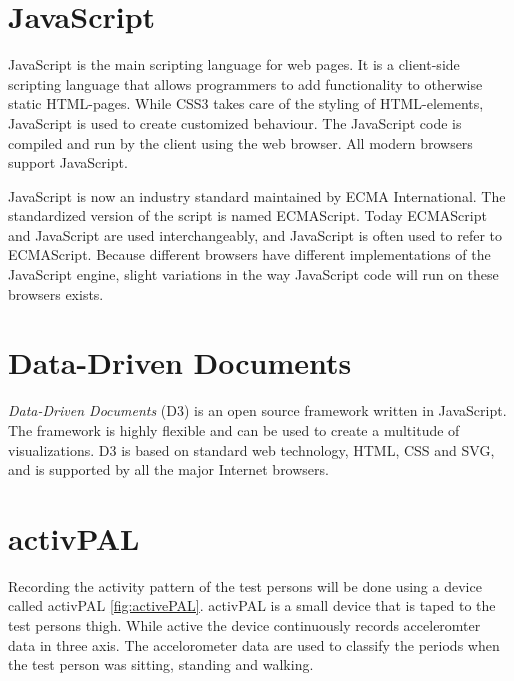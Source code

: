 \section{JavaScript}
JavaScript is the main scripting language for web pages. It is a client-side scripting language that allows programmers to add functionality to otherwise static HTML-pages. While CSS3 takes care of the styling of HTML-elements, JavaScript is used to create customized behaviour. The JavaScript code is compiled and run by the client using the web browser. All modern browsers support JavaScript. %

JavaScript is now an industry standard maintained by ECMA International. The standardized version of the script is named ECMAScript. Today ECMAScript and JavaScript are used interchangeably, and JavaScript is often used to refer to ECMAScript. Because different browsers have different implementations of the JavaScript engine, slight variations in the way JavaScript code will run on these browsers exists.
      
\section{Data-Driven Documents}
\emph{Data-Driven Documents} (D3) is an open source framework written in JavaScript. The framework is highly flexible and can be used to create a multitude of visualizations. D3 is based on standard web technology, HTML, CSS and SVG, and is supported by all the major Internet browsers.


\section{activPAL}
Recording the activity pattern of the test persons will be done using a device called activPAL \ref{fig:activePAL}. activPAL is a small device that is taped to the test persons thigh. While active the device continuously records acceleromter data in three axis. The accelorometer data are used to classify the periods when the test person was sitting, standing and walking.

